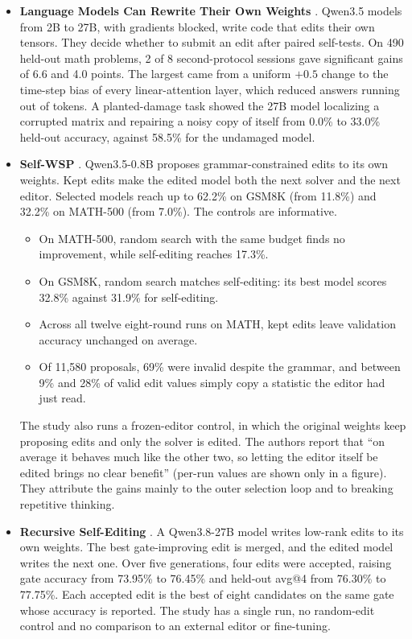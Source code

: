 \begin{itemize}[leftmargin=*,itemsep=3pt]
\item \textbf{Language Models Can Rewrite Their Own Weights} \citep{ax2611_21885}. Qwen3.5 models from 2B to 27B, with gradients blocked, write code that edits their own tensors. They decide whether to submit an edit after paired self-tests. On 490 held-out math problems, 2 of 8 second-protocol sessions gave significant gains of 6.6 and 4.0 points. The largest came from a uniform $+0.5$ change to the time-step bias of every linear-attention layer, which reduced answers running out of tokens. A planted-damage task showed the 27B model localizing a corrupted matrix and repairing a noisy copy of itself from 0.0\% to 33.0\% held-out accuracy, against 58.5\% for the undamaged model.
\item \textbf{Self-WSP} \citep{ax2611_28833}. Qwen3.5-0.8B proposes grammar-constrained edits to its own weights. Kept edits make the edited model both the next solver and the next editor. Selected models reach up to 62.2\% on GSM8K (from 11.8\%) and 32.2\% on MATH-500 (from 7.0\%). The controls are informative.
  \begin{itemize}[leftmargin=*,itemsep=1pt]
  \item On MATH-500, random search with the same budget finds no improvement, while self-editing reaches 17.3\%.
  \item On GSM8K, random search matches self-editing: its best model scores 32.8\% against 31.9\% for self-editing.
  \item Across all twelve eight-round runs on MATH, kept edits leave validation accuracy unchanged on average.
  \item Of 11{,}580 proposals, 69\% were invalid despite the grammar, and between 9\% and 28\% of valid edit values simply copy a statistic the editor had just read.
  \end{itemize}
  The study also runs a frozen-editor control, in which the original weights keep proposing edits and only the solver is edited. The authors report that ``on average it behaves much like the other two, so letting the editor itself be edited brings no clear benefit'' (per-run values are shown only in a figure). They attribute the gains mainly to the outer selection loop and to breaking repetitive thinking.
\item \textbf{Recursive Self-Editing} \citep{ax2611_29513}. A Qwen3.8-27B model writes low-rank edits to its own weights. The best gate-improving edit is merged, and the edited model writes the next one. Over five generations, four edits were accepted, raising gate accuracy from 73.95\% to 76.45\% and held-out avg@4 from 76.30\% to 77.75\%. Each accepted edit is the best of eight candidates on the same gate whose accuracy is reported. The study has a single run, no random-edit control and no comparison to an external editor or fine-tuning.

\end{itemize}
